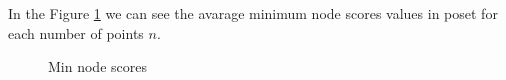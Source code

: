 \documentclass{article}
\begin{document}
\par In the Figure \ref{fig:scores_node_min} we can see the avarage minimum node scores values in poset for each number of points $n$.
\begin{figure}[ht]
  \vspace{-108pt}
  \centering
  \hspace*{-0.48\textwidth}
  \caption{Min node scores}
  \label{fig:scores_node_min}
\end{figure}
\end{document}
